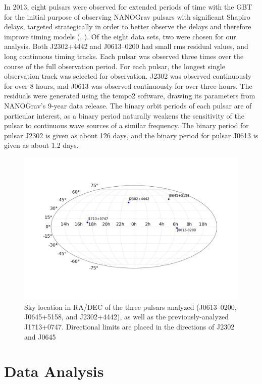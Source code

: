 \documentclass[12pt]{article}
\begin{document}
   In 2013, eight pulsars were observed for extended periods of time with the GBT for the
initial purpose of observing NANOGrav pulsars with significant Shapiro delays,
targeted strategically in order to better observe the delays and therefore
improve timing models (\cite{Pennucci2015}, \cite{Fonseca2016}). 
Of the eight data sets, two were chosen for our
analysis. Both J2302+4442 and J0613--0200 had small rms residual values, and
long continuous timing tracks.  Each pulsar was observed three times over the
course of the full observation period.  For each pulsar, the longest single
observation track was selected for observation. J2302 was observed continuously
for over 8 hours, and J0613 was observed continuously for over three hours.
The residuals were generated using the tempo2 software, drawing its parameters
from NANOGrav's 9-year data release. The binary orbit periods of each pulsar
are of particular interest, as a binary period naturally weakens the
sensitivity of the pulsar to continuous wave sources of a similar frequency.
The binary period for pulsar J2302 is given as about 126 days, and the binary
period for pulsar J0613 is given as about 1.2 days.

\begin{figure}[h!]
    \caption{Sky location in RA/DEC of the three pulsars analyzed (J0613--0200,
    J0645+5158, and
J2302+4442), as well as the previously-analyzed J1713+0747. Directional limits
    are placed in the directions of J2302 and J0645}
    \includegraphics[width=\textwidth]{./figures/skyplot.png}
\end{figure}



\section{Data Analysis}
\end{document}
